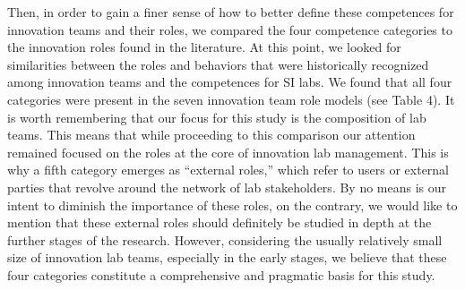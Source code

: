 \documentclass[AMA,STIX1COL,APA,STIX2COL]{WileyNJD-v2}
\begin{document}
Then, in order to gain a finer sense of how to better define these
competences for innovation teams and their roles, we compared the four
competence categories to the innovation roles found in the literature.
At this point, we looked for similarities between the roles and
behaviors that were historically recognized among innovation teams and
the competences for SI labs. We found that all four categories were
present in the seven innovation team role models (see Table 4). It is
worth remembering that our focus for this study is the composition of
lab teams. This means that while proceeding to this comparison our
attention remained focused on the roles at the core of innovation lab
management. This is why a fifth category emerges as ``external roles,''
which refer to users or external parties that revolve around the network
of lab stakeholders. By no means is our intent to diminish the
importance of these roles, on the contrary, we would like to mention
that these external roles should definitely be studied in depth at the
further stages of the research. However, considering the usually
relatively small size of innovation lab teams, especially in the early
stages, we believe that these four categories constitute a comprehensive
and pragmatic basis for this study.

\providecommand{\docline}[3]{\noalign{\global\setlength{\arrayrulewidth}{#1}}\arrayrulecolor[HTML]{#2}\cline{#3}}

\setlength{\tabcolsep}{2pt}

\renewcommand*{\arraystretch}{1.5}
\end{document}

